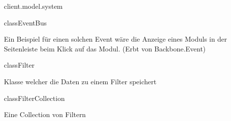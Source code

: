 \begin{texdocpackage}{client.model.system}
\begin{texdocclass}{class}{EventBus}
\begin{texdocclassintro}
 Ein Beispiel für einen solchen Event wäre die Anzeige eines Moduls in der
 Seitenleiste beim Klick auf das Modul. (Erbt von Backbone.Event)\end{texdocclassintro}
\begin{texdocclassconstructors}
\end{texdocclassconstructors}
\begin{texdocclassmethods}
\end{texdocclassmethods}
\end{texdocclass}


\begin{texdocclass}{class}{Filter}
\label{texdoclet:edu.kit.informatik.studyplan.client.model.system.Filter}
\begin{texdocclassintro}
Klasse welcher die Daten zu einem Filter speichert\end{texdocclassintro}
\begin{texdocclassconstructors}
\end{texdocclassconstructors}
\begin{texdocclassmethods}
\end{texdocclassmethods}
\end{texdocclass}


\begin{texdocclass}{class}{FilterCollection}
\label{texdoclet:edu.kit.informatik.studyplan.client.model.system.FilterCollection}
\begin{texdocclassintro}
Eine Collection von Filtern\end{texdocclassintro}
\begin{texdocclassconstructors}
\end{texdocclassconstructors}
\end{texdocclass}



\end{texdocpackage}
